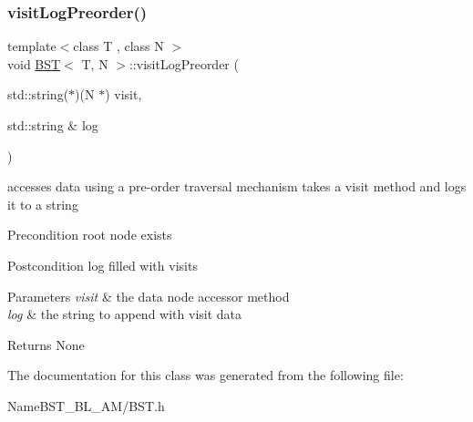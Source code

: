 \subsubsection{\texorpdfstring{visit\+Log\+Preorder()}{visitLogPreorder()}}
{\footnotesize\ttfamily template$<$class T , class N $>$ \\
void \hyperlink{class_b_s_t}{B\+ST}$<$ T, N $>$\+::visit\+Log\+Preorder (\begin{DoxyParamCaption}\item[{std\+::string($\ast$)(N $\ast$)}]{visit,  }\item[{std\+::string \&}]{log }\end{DoxyParamCaption})}

accesses data using a pre-\/order traversal mechanism takes a visit method and logs it to a string \begin{DoxyPrecond}{Precondition}
root node exists 
\end{DoxyPrecond}
\begin{DoxyPostcond}{Postcondition}
log filled with visits 
\end{DoxyPostcond}

\begin{DoxyParams}{Parameters}
{\em visit} & the data node accessor method \\
\hline
{\em log} & the string to append with visit data \\
\hline
\end{DoxyParams}
\begin{DoxyReturn}{Returns}
None 
\end{DoxyReturn}


The documentation for this class was generated from the following file\+:\begin{DoxyCompactItemize}
\item 
Name\+B\+S\+T\+\_\+\+B\+L\+\_\+\+A\+M/B\+S\+T.\+h\end{DoxyCompactItemize}
